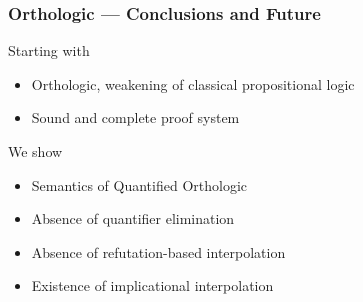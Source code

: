 \documentclass[
    aspectratio=169,
    xcolor={dvipsnames},
]{beamer}
\begin{document}
\begin{frame}
    \frametitle{Orthologic --- Conclusions and Future}

    Starting with
    \begin{itemize}
        \item Orthologic, weakening of classical propositional logic
        \item Sound and complete proof system
    \end{itemize}

    We show
    \begin{itemize}
        \item Semantics of Quantified Orthologic
        \item Absence of quantifier elimination
        \item Absence of refutation-based interpolation
        \item Existence of implicational interpolation
    \end{itemize}


\end{frame}

\begin{frame}

    \printbibliography    

\end{frame}
\end{document}
